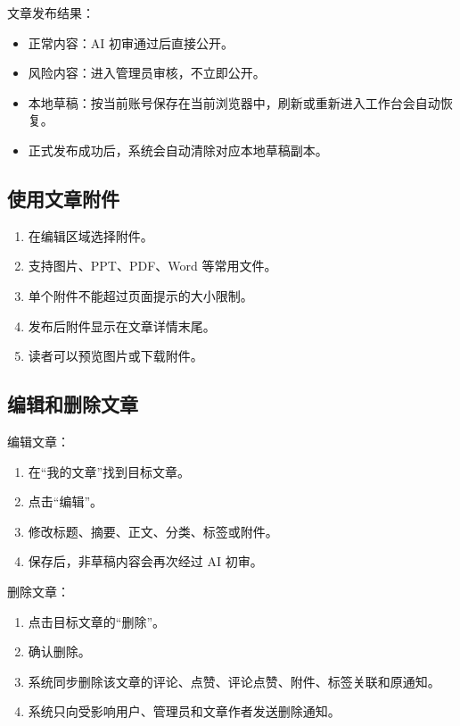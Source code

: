 \documentclass[UTF8,a4paper,12pt]{ctexart}
\begin{document}
文章发布结果：

\begin{itemize}
  \item 正常内容：AI 初审通过后直接公开。
  \item 风险内容：进入管理员审核，不立即公开。
  \item 本地草稿：按当前账号保存在当前浏览器中，刷新或重新进入工作台会自动恢复。
  \item 正式发布成功后，系统会自动清除对应本地草稿副本。
\end{itemize}

\subsection{使用文章附件}

\begin{enumerate}
  \item 在编辑区域选择附件。
  \item 支持图片、PPT、PDF、Word 等常用文件。
  \item 单个附件不能超过页面提示的大小限制。
  \item 发布后附件显示在文章详情末尾。
  \item 读者可以预览图片或下载附件。
\end{enumerate}

\subsection{编辑和删除文章}

编辑文章：

\begin{enumerate}
  \item 在“我的文章”找到目标文章。
  \item 点击“编辑”。
  \item 修改标题、摘要、正文、分类、标签或附件。
  \item 保存后，非草稿内容会再次经过 AI 初审。
\end{enumerate}

删除文章：

\begin{enumerate}
  \item 点击目标文章的“删除”。
  \item 确认删除。
  \item 系统同步删除该文章的评论、点赞、评论点赞、附件、标签关联和原通知。
  \item 系统只向受影响用户、管理员和文章作者发送删除通知。
\end{enumerate}
\end{document}
